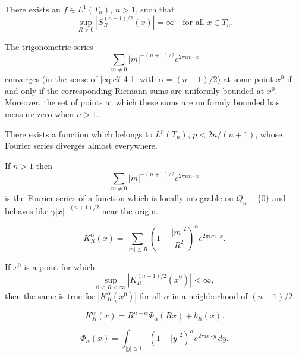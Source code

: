 \begin{theorem}\label{thm:c7-4-2}
There exists an $f \in L^1(T_n)$, $n > 1$, such that
\[
\sup_{R > 0} |S_R^{(n-1)/2}(x)| = \infty \quad \text{for all } x \in T_n.
\]
\end{theorem}

\begin{theorem}\label{thm:c7-4-3}
The trigonometric series
\begin{equation}\label{eq:c7-4-4}
\sum_{m \neq 0} |m|^{-(n+1)/2} e^{2\pi i m \cdot x}
\end{equation}
converges (in the sense of \eqref{eq:c7-4-1} with $\alpha = (n-1)/2$) at some point $x^0$ if and only if the corresponding Riemann sums are uniformly bounded at $x^0$. Moreover, the set of points at which these sums are uniformly bounded has measure zero when $n > 1$.
\end{theorem}

\begin{corollary}\label{cor:c7-4-5}
There exists a function which belongs to $L^p(T_n)$, $p < 2n/(n+1)$, whose Fourier series diverges almost everywhere.
\end{corollary}

\begin{lemma}\label{lem:c7-4-6}
If $n > 1$ then
\[
\sum_{m \neq 0} |m|^{-(n+1)/2} e^{2\pi i m \cdot x}
\]
is the Fourier series of a function which is locally integrable on $Q_n - \{0\}$ and behaves like $\gamma |x|^{-(n+1)/2}$ near the origin.
\end{lemma}

\begin{equation}\label{eq:c7-4-7}
K_R^\alpha(x) = \sum_{|m| \leq R} \left(1 - \frac{|m|^2}{R^2}\right)^\alpha e^{2\pi i m \cdot x}.
\end{equation}

\begin{lemma}\label{lem:c7-4-8}
If $x^0$ is a point for which
\[
\sup_{0 < R < \infty} |K_R^{(n-1)/2}(x^0)| < \infty,
\]
then the same is true for $|K_R^\alpha(x^0)|$ for all $\alpha$ in a neighborhood of $(n-1)/2$.
\end{lemma}

\begin{equation}\label{eq:c7-4-9}
K_R^\alpha(x) = R^{n-\alpha} \Phi_\alpha(Rx) + b_R(x).
\end{equation}

\begin{equation}\label{eq:c7-4-10}
\Phi_\alpha(x) = \int_{|y| \leq 1} (1 - |y|^2)^\alpha e^{2\pi i x \cdot y}\,dy.
\end{equation}

